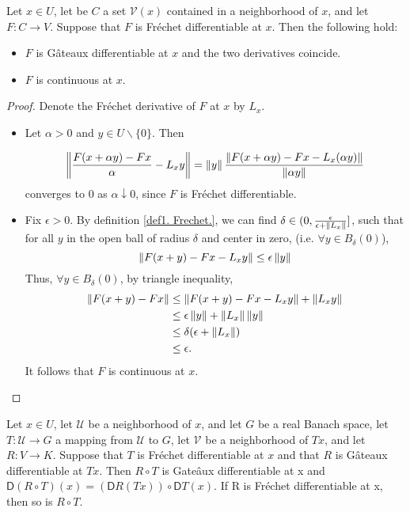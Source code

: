 \begin{lemma}
	Let $x \in U$, let be $C$ a set $\mathcal{V}(x)$ contained in a neighborhood of $x$, and let $F: C \rightarrow V$. Suppose that $F$ is Fr\'echet differentiable at $x$. Then the following hold:
	\begin{itemize}
	\item  $F$ is G\^ateaux differentiable at $x$ and the two derivatives coincide.
	\item $F$ is continuous at $x$.
	\end{itemize}
	\begin{proof}
		Denote the Fr\'echet derivative of $F$ at $x$ by $L_x$.
		\begin{itemize}
			\item Let $\alpha >0$ and $y \in U\backslash\{0\}$. Then
			
			\[
				\left\lVert\frac{F(x+\alpha y)-Fx}{\alpha}-L_xy\right\rVert = \left\lVert y\right\rVert\frac{\left\lVert F(x+\alpha y)-Fx-L_x(\alpha y)\right\rVert}{\left\lVert\alpha y\right\rVert}
			\]
			converges to $0$ as $\alpha \downarrow 0$, since $F$ is Fr\'echet differentiable.
			\item Fix $\epsilon > 0$. By definition \ref{def1. Frechet.}, we can find $\delta \in  (0, \frac{\epsilon}{\epsilon + \left\lVert L_x\right\rVert}]$, such that for all $y$ in the open ball of radius $\delta$ and center in zero, (i.e. $\forall y \in B_\delta(0)$), 
			\[
			   \left\lVert F(x+y)-Fx-L_xy\right\rVert \leq \epsilon \left\lVert y\right\rVert\]
			Thus, $\forall y \in B_\delta(0)$,  by triangle inequality, 
			 \begin{align*}  
			\left\lVert F(x+y)-Fx\right\rVert &\leq \left\lVert F(x+y) -Fx-L_xy\right\rVert + 
			\left\lVert L_xy\right\rVert \\ &\leq \epsilon \left\lVert y\right\rVert + \left\lVert L_x \right\rVert\left\lVert y\right\rVert \\ &\leq \delta(\epsilon + \left\lVert L_x\right\rVert)
			\\
			&\leq \epsilon.
			\end{align*}
			It follows that $F$ is continuous at $x$.
		\end{itemize}
	\end{proof}
\end{lemma}



\begin{fact}
	\label{fact1. Chain Rule}
	Let $x\in U$,  let $\mathcal{U}$ be a neighborhood of $x$, and let $G$ be a real Banach space, let $T: \mathcal{U}\rightarrow G$ a mapping from $\mathcal{U}$ to $G$, let $\mathcal{V}$ be a neighborhood of $Tx$, and let $R : V \rightarrow K$.
	Suppose that $T$ is Fr\'echet differentiable at $x$ and that $R$ is G\^ateaux differentiable at $Tx$. Then $R\circ T$ is Gate\^aux differentiable at x and $\mathsf{D}(R \circ T )(x) =
	(\mathsf{D}R(Tx))\circ \mathsf{D}T (x)$. If R is Fr\'echet differentiable at x, then so is $R \circ T $.
\end{fact}

